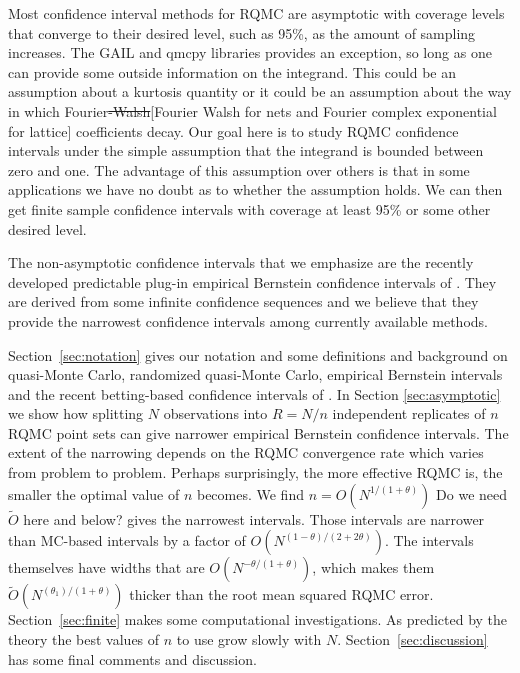 \documentclass{article}
\newcommand{\fred}[1]{\begingroup\color{red}#1\endgroup}
\begin{document}
Most confidence interval methods for RQMC are asymptotic
with coverage levels that converge to their desired level,
such as 95\%, as the amount of sampling increases.  The GAIL \fred{\cite{Gail_ug} and qmcpy \cite{QMCPy2020a} } libraries provides an exception, so long as one can
provide some outside information on the integrand.  This could
be an assumption about a kurtosis quantity or it could be
an assumption about the way  in which Fourier\fred{\sout{-Walsh}[Fourier Walsh for nets and Fourier complex exponential for lattice]} coefficients
decay.  Our goal here is to study RQMC confidence intervals
under the simple assumption that the integrand is bounded between
zero and one.  The advantage of this assumption over others is 
that in some applications we have no doubt as to whether the
assumption holds. We can then get finite sample confidence
intervals with coverage at least 95\% or some other desired level.

The non-asymptotic confidence intervals that we emphasize are the
recently developed predictable plug-in empirical Bernstein
confidence intervals of \cite{WauRam24a}. They are derived
from some infinite confidence sequences and we believe that
they provide the narrowest confidence intervals among
currently available methods.

Section~\ref{sec:notation} gives our notation
and some definitions and background on quasi-Monte
Carlo, randomized quasi-Monte Carlo, empirical Bernstein
intervals and the recent betting-based confidence
intervals of \cite{WauRam24a}. In Section \ref{sec:asymptotic}
we show how splitting $N$ observations into $R=N/n$ independent
replicates of $n$ RQMC point sets can give narrower
empirical Bernstein confidence intervals.  The extent of the
narrowing depends on the RQMC convergence rate which
varies from problem to problem. Perhaps surprisingly,
the more effective RQMC is, the smaller the optimal value
of $n$ becomes. We find $n=O(N^{1/(1+\theta)})$ \fred{Do we need $\tilde O$ here and below?} gives
the narrowest intervals.  Those intervals are narrower
than MC-based intervals by a factor of $O(N^{(1-\theta)/(2+2\theta)})$.
The intervals themselves have widths that are
$O(N^{-\theta/(1+\theta)})$\fred{, which makes them $\tilde O(N^{(\theta_1)/(1+\theta)})$ thicker than the root mean squared RQMC error}. Section~\ref{sec:finite} makes
some computational investigations.  As predicted by the theory
the best values of $n$ to use grow slowly with $N$.
Section~\ref{sec:discussion} has some final comments
and discussion.
\end{document}
